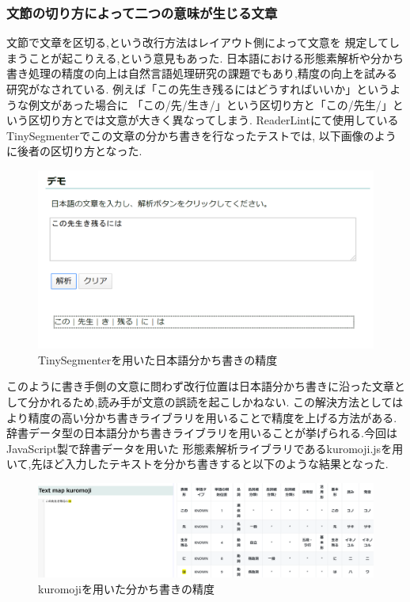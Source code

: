\subsubsection{文節の切り方によって二つの意味が生じる文章}
文節で文章を区切る,という改行方法はレイアウト側によって文意を
規定してしまうことが起こりえる,という意見もあった.
日本語における形態素解析や分かち書き処理の精度の向上は自然言語処理研究の課題でもあり,精度の向上を試みる研究がなされている.
例えば「この先生き残るにはどうすればいいか」というような例文があった場合に
「この/先/生き/」という区切り方と「この/先生/」という区切り方とでは文意が大きく異なってしまう.
ReaderLintにて使用しているTinySegmenterでこの文章の分かち書きを行なったテストでは,
以下画像のように後者の区切り方となった.
\begin{figure}[H]
    \centering
    \label{fig:seid}
    \includegraphics[width=0.7\columnwidth]{image/04/img2.png}
    \caption[TinySegmenterを用いた日本語分かち書きの精度] {TinySegmenterを用いた日本語分かち書きの精度}\footnotemark[1]
\end{figure}

このように書き手側の文意に問わず改行位置は日本語分かち書きに沿った文章として分かれるため,読み手が文意の誤読を起こしかねない.
この解決方法としてはより精度の高い分かち書きライブラリを用いることで精度を上げる方法がある.
辞書データ型の日本語分かち書きライブラリを用いることが挙げられる.今回はJavaScript製で辞書データを用いた
形態素解析ライブラリであるkuromoji.jsを用いて,先ほど入力したテキストを分かち書きすると以下のような結果となった.
\begin{figure}[H]
    \centering
    \label{fig:seid2}
    \includegraphics[width=0.7\columnwidth]{image/04/img3.png}
    \caption[kuromojiを用いた分かち書きの精度] {kuromojiを用いた分かち書きの精度}\footnotemark[2]
\end{figure}


